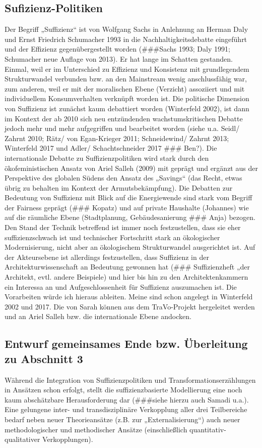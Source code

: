 \documentclass[a4paper,11pt,twoside]{scrartcl}
\begin{document}
\subsection*{Sufizienz-Politiken}
Der Begriff „Suffizienz“ ist von Wolfgang Sachs in Anlehnung an Herman Daly und Ernst Friedrich Schumacher 1993 in die Nachhaltigkeitsdebatte eingeführt und der Effizienz gegenübergestellt worden (###Sachs 1993; Daly 1991; Schumacher neue Auflage von 2013). Er hat lange im Schatten gestanden. Einmal, weil er im Unterschied zu Effizienz und Konsistenz mit grundlegendem Strukturwandel verbunden bzw. an den Mainstream wenig anschlussfähig war, zum anderen, weil er mit der moralischen Ebene (Verzicht) assoziiert und mit individuellem Konsumverhalten verknüpft worden ist. Die politische Dimension von Suffizienz ist zunächst kaum debattiert worden (Winterfeld 2002), ist dann im Kontext der ab 2010 sich neu entzündenden wachstumskritischen Debatte jedoch mehr und mehr aufgegriffen und bearbeitet worden (siehe u.a. Seidl/ Zahrnt 2010; Rätz/ von Egan-Krieger 2011; Schneidewind/ Zahrnt 2013; Winterfeld 2017 und Adler/ Schachtschneider 2017 ### Ben?). Die internationale Debatte zu Suffizienzpolitiken wird stark durch den ökofeministischen Ansatz von Ariel Salleh (2009) mit geprägt und ergänzt aus der Perspektive des globalen Südens den Ansatz des „Savings“ (das Recht, etwas übrig zu behalten im Kontext der Armutsbekämpfung).
Die Debatten zur Bedeutung von Suffizienz mit Blick auf die Energiewende sind stark vom Begriff der Fairness geprägt (### Kopatz) und auf private Haushalte (Johannes) wie auf die räumliche Ebene (Stadtplanung, Gebäudesanierung ### Anja) bezogen. 
Den Stand der Technik betreffend ist immer noch festzustellen, dass sie eher suffizienzschwach ist und technischer Fortschritt stark an ökologischer Modernisierung, nicht aber an ökologischem Strukturwandel ausgerichtet ist. Auf der Akteursebene ist allerdings festzustellen, dass Suffizienz in der Architekturwissenschaft an Bedeutung gewonnen hat (### Suffizienzheft „der Architekt, evtl. andere Beispiele) und hier bis hin zu den Architektenkammern ein Interessa an und Aufgeschlossenheit für Suffizienz auszumachen ist.
Die Vorarbeiten würde ich hieraus ableiten. Meine sind schon angelegt in Winterfeld 2002 und 2017. Die von Sarah können aus dem TraVo-Projekt hergeleitet werden und an Ariel Salleh bzw. die internationale Ebene andocken.

\subsection*{Entwurf gemeinsames Ende bzw. Überleitung zu Abschnitt 3}
Während die Integration von Suffizienzpolitiken und Transformationserzählungen in Ansätzen schon erfolgt, stellt die suffizienzbasierte Modellierung eine noch kaum abschätzbare Herausforderung dar (###siehe hierzu auch Samadi u.a.). Eine gelungene inter- und transdisziplinäre Verkopplung aller drei Teilbereiche bedarf neben neuer Theorieansätze (z.B. zur „Externalisierung“) auch neuer methodologischer und methodischer Ansätze (einschließlich quantitativ-qualitativer Verkopplungen). 
\end{document}
